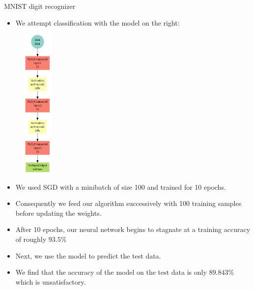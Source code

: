 \begin{vbframe}{MNIST digit recognizer}
\framebreak
  \begin{minipage}{0.45\textwidth}
    \begin{itemize}
      \item We attempt classification with the model on the right:
    \end{itemize}
  \end{minipage}
  \begin{minipage}{0.45\textwidth}
    \begin{figure}
      \centering
        \includegraphics[width=1.5cm]{figure/mxnet_codechunk_4b.png}
    \end{figure}
  \end{minipage}



\framebreak
  \begin{itemize}
    \item We used SGD with a minibatch of size 100 and trained for 10 epochs.
    \item Consequently we feed our algorithm successively with 100 training samples before updating the weights.
    \item After 10 epochs, our neural network begins to stagnate at a training accuracy of roughly $93.5\%$
    \item Next, we use the model to predict the test data.
    \item We find that the accuracy of the model on the test data is only $89.843\%$ which is unsatisfactory. 
  \end{itemize}
  

\end{vbframe}
